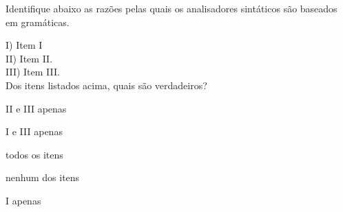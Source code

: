 \question[10]

Identifique abaixo as razões pelas quais os analisadores sintáticos são
baseados em gramáticas.

I) Item I\\
II) Item II.\\
III) Item III.\\

Dos itens listados acima, quais são verdadeiros?\\

\begin{choices}
\item II e III apenas
\item I e III apenas
\item todos os itens %
\item nenhum dos itens
\item I apenas
\end{choices}
\answerline


